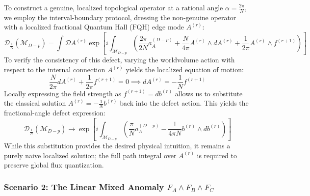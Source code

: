 \documentclass[aps,preprint,nofootinbib,preprintnumbers,eqsecnum,superscriptaddress]{revtex4}
\numberwithin{equation}{section}
\begin{document}
To construct a genuine, localized topological operator at a rational angle $\alpha = \frac{2\pi}{N}$, we employ the interval-boundary protocol, dressing the non-genuine operator with a localized fractional Quantum Hall ($\text{FQH}$) edge mode $A^{(r)}$:
\begin{equation}
    \mathcal{D}_{\frac{1}{N}}(\mathcal{M}_{D-p}) = \int \mathcal{D}A^{(r)} \exp \left[ i \int_{\mathcal{M}_{D-p}} \left( \frac{2\pi}{2N} a^{(D-p)}_A + \frac{N}{4\pi} A^{(r)} \wedge dA^{(r)} + \frac{1}{2\pi} A^{(r)} \wedge f^{(r+1)} \right) \right]
\end{equation}
To verify the consistency of this defect, varying the worldvolume action with respect to the internal connection $A^{(r)}$ yields the localized equation of motion:
\begin{equation}
    \frac{N}{2\pi} dA^{(r)} + \frac{1}{2\pi} f^{(r+1)} = 0 \implies dA^{(r)} = -\frac{1}{N} f^{(r+1)}
\end{equation}
Locally expressing the field strength as $f^{(r+1)} = db^{(r)}$ allows us to substitute the classical solution $A^{(r)} = -\frac{1}{N} b^{(r)}$ back into the defect action. This yields the fractional-angle defect expression:
\begin{equation}
    \mathcal{D}_{\frac{1}{N}}(\mathcal{M}_{D-p}) \longrightarrow \exp \left[ i \int_{\mathcal{M}_{D-p}} \left( \frac{\pi}{N} a^{(D-p)}_A - \frac{1}{4\pi N} b^{(r)} \wedge db^{(r)} \right) \right]
\end{equation}
While this substitution provides the desired physical intuition, it remains a purely naive localized solution; the full path integral over $A^{(r)}$ is required to preserve global flux quantization.

\subsubsection{Scenario 2: The Linear Mixed Anomaly $F_A \wedge F_B \wedge F_C$}\label{sec:scenario2}
\end{document}
